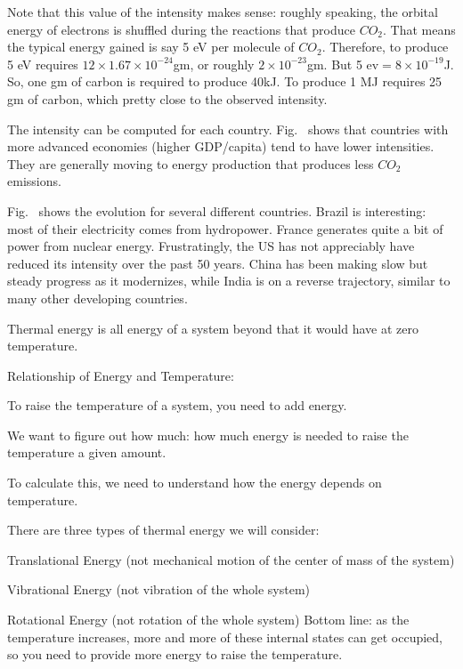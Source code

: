 \documentclass[11pt]{book}
\begin{document}
Note that this value of the intensity makes sense: roughly speaking, the orbital energy of electrons is shuffled during the reactions that produce $CO_2$. That means the typical energy gained is say 5 eV per molecule of $CO_2$. Therefore, to produce 5 eV requires $12\times 1.67\times 10^{-24}$gm, or roughly $2\times10^{-23}$gm. But 5 ev$=8\times 10^{-19}$J. So, one gm of carbon is required to produce 40kJ. To produce 1 MJ requires 25 gm of carbon, which pretty close to the observed intensity.

The intensity can be computed for each country. Fig.~ shows that countries with more advanced economies (higher GDP/capita) tend to have lower intensities. They are generally moving to energy production that produces less $CO_2$ emissions. 

Fig.~ shows the evolution for several different countries. Brazil is interesting: most of their electricity comes from hydropower. France generates quite a bit of power from nuclear energy. Frustratingly, the US has not appreciably have reduced its intensity over the past 50 years. China has been making slow but steady progress as it modernizes, while India is on a reverse trajectory, similar to many other developing countries.



Thermal energy is all energy of a system beyond that it would have at zero temperature.

Relationship of Energy and Temperature: 
\bei
\item To raise the temperature of a system, you need to add energy. 
\item We want to figure out how much: how much energy is needed to raise the temperature a given amount. 
\item To calculate this, we need to understand how the energy depends on temperature. 
\eei

There are three types of thermal energy we will consider:
\bei
\item Translational Energy (not mechanical motion of the center of mass of the system)
\item Vibrational Energy (not vibration of the whole system)
\item Rotational Energy (not rotation of the whole system)
\eei
Bottom line: as the temperature increases, more and more of these internal states can get occupied, so you need to provide more energy to raise the temperature.
\end{document}
